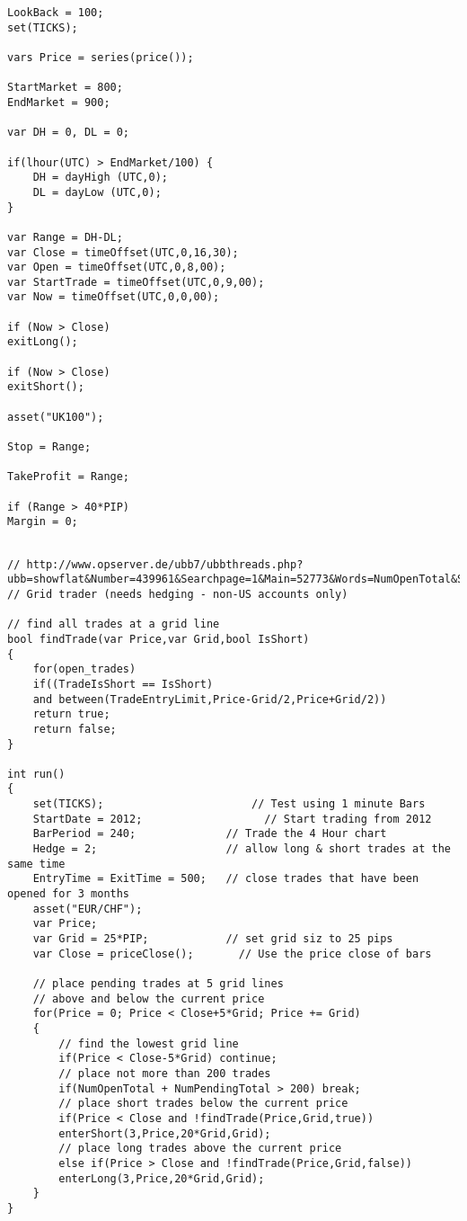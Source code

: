 \begin{lstlisting}[caption=First Hour Breakout System II]
LookBack = 100;
set(TICKS);

vars Price = series(price());

StartMarket = 800;
EndMarket = 900;

var DH = 0, DL = 0;

if(lhour(UTC) > EndMarket/100) {
	DH = dayHigh (UTC,0);
	DL = dayLow (UTC,0);
}

var Range = DH-DL;
var Close = timeOffset(UTC,0,16,30);
var Open = timeOffset(UTC,0,8,00);
var StartTrade = timeOffset(UTC,0,9,00);
var Now = timeOffset(UTC,0,0,00);

if (Now > Close)
exitLong();

if (Now > Close)
exitShort();

asset("UK100"); 

Stop = Range; 

TakeProfit = Range;

if (Range > 40*PIP)
Margin = 0;
\end{lstlisting}


\begin{lstlisting}[caption=System III - Z4 similar]

// http://www.opserver.de/ubb7/ubbthreads.php?ubb=showflat&Number=439961&Searchpage=1&Main=52773&Words=NumOpenTotal&Search=true#Post439961
// Grid trader (needs hedging - non-US accounts only)

// find all trades at a grid line
bool findTrade(var Price,var Grid,bool IsShort)
{
	for(open_trades)
	if((TradeIsShort == IsShort)
	and between(TradeEntryLimit,Price-Grid/2,Price+Grid/2))
	return true;
	return false;
}

int run() 
{
	set(TICKS);					      // Test using 1 minute Bars
	StartDate = 2012;					// Start trading from 2012
	BarPeriod = 240;              // Trade the 4 Hour chart
	Hedge = 2;                    // allow long & short trades at the same time
	EntryTime = ExitTime = 500;   // close trades that have been opened for 3 months
	asset("EUR/CHF");
	var Price;							
	var Grid = 25*PIP;            // set grid siz to 25 pips
	var Close = priceClose();		// Use the price close of bars
	
	// place pending trades at 5 grid lines 
	// above and below the current price
	for(Price = 0; Price < Close+5*Grid; Price += Grid)
	{
		// find the lowest grid line
		if(Price < Close-5*Grid) continue;
		// place not more than 200 trades		
		if(NumOpenTotal + NumPendingTotal > 200) break;
		// place short trades below the current price
		if(Price < Close and !findTrade(Price,Grid,true))
		enterShort(3,Price,20*Grid,Grid);  		
		// place long trades above the current price
		else if(Price > Close and !findTrade(Price,Grid,false))
		enterLong(3,Price,20*Grid,Grid);
	}
}
\end{lstlisting}
